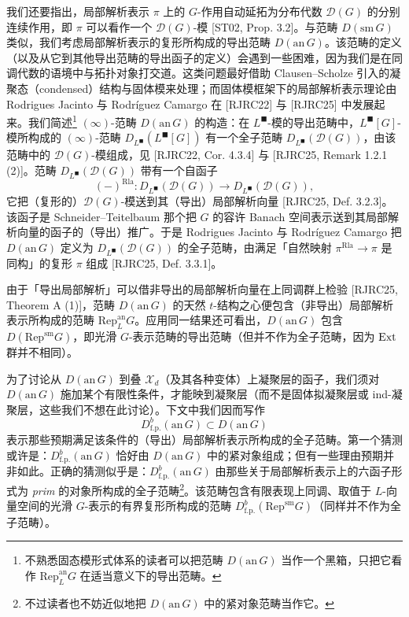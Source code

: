 我们还要指出，局部解析表示 $\pi$ 上的 $G$-作用自动延拓为分布代数 $\mathcal D(G)$ 的分别连续作用，即 $\pi$ 可以看作一个 $\mathcal D(G)$-模 [ST02, Prop. 3.2]。与范畴 $D(\mathrm{sm}\,G)$ 类似，我们考虑局部解析表示的复形所构成的导出范畴 $D(\mathrm{an}\,G)$。该范畴的定义（以及从它到其他导出范畴的导出函子的定义）会遇到一些困难，因为我们是在同调代数的语境中与拓扑对象打交道。这类问题最好借助 Clausen--Scholze 引入的凝聚态（condensed）结构与固体模来处理；而固体模框架下的局部解析表示理论由 Rodrigues Jacinto 与 Rodríguez Camargo 在 [RJRC22] 与 [RJRC25] 中发展起来。我们简述\footnote{不熟悉固态模形式体系的读者可以把范畴 $D(\mathrm{an}\,G)$ 当作一个黑箱，只把它看作 $\mathrm{Rep}^{\mathrm{an}}_L G$ 在适当意义下的导出范畴。} $(\infty)$-范畴 $D(\mathrm{an}\,G)$ 的构造：在 $L^\blacksquare$-模的导出范畴中，$L^\blacksquare[G]$-模所构成的 $(\infty)$-范畴 $D_{L^\blacksquare}(L^\blacksquare[G])$ 有一个全子范畴 $D_{L^\blacksquare}(\mathcal D(G))$，由该范畴中的 $\mathcal D(G)$-模组成，见 [RJRC22, Cor. 4.3.4] 与 [RJRC25, Remark 1.2.1 (2)]。范畴 $D_{L^\blacksquare}(\mathcal D(G))$ 带有一个自函子
\[
(-)^{\mathrm{Rla}}:D_{L^\blacksquare}(\mathcal D(G))\longrightarrow D_{L^\blacksquare}(\mathcal D(G)),
\]
它把（复形的）$\mathcal D(G)$-模送到其（导出）局部解析向量 [RJRC25, Def. 3.2.3]。该函子是 Schneider--Teitelbaum 那个把 $G$ 的容许 Banach 空间表示送到其局部解析向量的函子的（导出）推广。于是 Rodrigues Jacinto 与 Rodríguez Camargo 把 $D(\mathrm{an}\,G)$ 定义为 $D_{L^\blacksquare}(\mathcal D(G))$ 的全子范畴，由满足「自然映射 $\pi^{\mathrm{Rla}}\to\pi$ 是同构」的复形 $\pi$ 组成 [RJRC25, Def. 3.3.1]。

由于「导出局部解析」可以借非导出的局部解析向量在上同调群上检验 [RJRC25, Theorem A (1)]，范畴 $D(\mathrm{an}\,G)$ 的天然 $t$-结构之心便包含（非导出）局部解析表示所构成的范畴 $\mathrm{Rep}^{\mathrm{an}}_L G$。应用同一结果还可看出，$D(\mathrm{an}\,G)$ 包含 $D(\mathrm{Rep}^{\mathrm{sm}}G)$，即光滑 $G$-表示范畴的导出范畴（但并不作为全子范畴，因为 $\operatorname{Ext}$ 群并不相同）。

为了讨论从 $D(\mathrm{an}\,G)$ 到叠 $\mathcal X_d$（及其各种变体）上凝聚层的函子，我们须对 $D(\mathrm{an}\,G)$ 施加某个有限性条件，才能映到凝聚层（而不是固体拟凝聚层或 ind-凝聚层，这些我们不想在此讨论）。下文中我们因而写作
\[
D^b_{\mathrm{f.p.}}(\mathrm{an}\,G)\subset D(\mathrm{an}\,G)
\]
表示那些预期满足该条件的（导出）局部解析表示所构成的全子范畴。第一个猜测或许是：$D^b_{\mathrm{f.p.}}(\mathrm{an}\,G)$ 恰好由 $D(\mathrm{an}\,G)$ 中的紧对象组成；但有一些理由预期并非如此。正确的猜测似乎是：$D^b_{\mathrm{f.p.}}(\mathrm{an}\,G)$ 由那些关于局部解析表示上的六函子形式为 \emph{prim} 的对象所构成的全子范畴\footnote{不过读者也不妨近似地把 $D(\mathrm{an}\,G)$ 中的紧对象范畴当作它。}。该范畴包含有限表现上同调、取值于 $L$-向量空间的光滑 $G$-表示的有界复形所构成的范畴 $D^b_{\mathrm{f.p.}}(\mathrm{Rep}^{\mathrm{sm}}G)$（同样并不作为全子范畴）。

